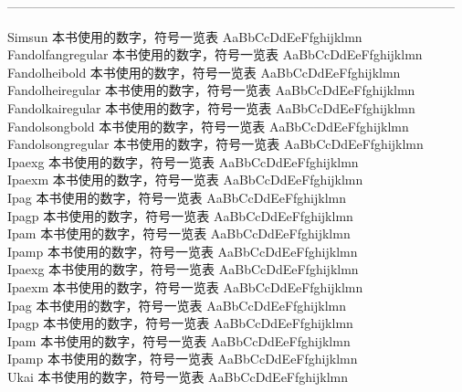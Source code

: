 ———————————————————————————————————

Simsun {\cjk\mktsFontfileSimsun{}本书使用的数字，符号一览表 AaBbCcDdEeFfghijklmn}\\
Fandolfangregular {\cjk\mktsFontfileFandolfangregular{}本书使用的数字，符号一览表 AaBbCcDdEeFfghijklmn}\\
Fandolheibold {\cjk\mktsFontfileFandolheibold{}本书使用的数字，符号一览表 AaBbCcDdEeFfghijklmn}\\
Fandolheiregular {\cjk\mktsFontfileFandolheiregular{}本书使用的数字，符号一览表 AaBbCcDdEeFfghijklmn}\\
Fandolkairegular {\cjk\mktsFontfileFandolkairegular{}本书使用的数字，符号一览表 AaBbCcDdEeFfghijklmn}\\
Fandolsongbold {\cjk\mktsFontfileFandolsongbold{}本书使用的数字，符号一览表 AaBbCcDdEeFfghijklmn}\\
Fandolsongregular {\cjk\mktsFontfileFandolsongregular{}本书使用的数字，符号一览表 AaBbCcDdEeFfghijklmn}\\
Ipaexg {\cjk\mktsFontfileIpaexg{}本书使用的数字，符号一览表 AaBbCcDdEeFfghijklmn}\\
Ipaexm {\cjk\mktsFontfileIpaexm{}本书使用的数字，符号一览表 AaBbCcDdEeFfghijklmn}\\
Ipag {\cjk\mktsFontfileIpag{}本书使用的数字，符号一览表 AaBbCcDdEeFfghijklmn}\\
Ipagp {\cjk\mktsFontfileIpagp{}本书使用的数字，符号一览表 AaBbCcDdEeFfghijklmn}\\
Ipam {\cjk\mktsFontfileIpam{}本书使用的数字，符号一览表 AaBbCcDdEeFfghijklmn}\\
Ipamp {\cjk\mktsFontfileIpamp{}本书使用的数字，符号一览表 AaBbCcDdEeFfghijklmn}\\
Ipaexg {\cjk\mktsFontfileIpaexg{}本书使用的数字，符号一览表 AaBbCcDdEeFfghijklmn}\\
Ipaexm {\cjk\mktsFontfileIpaexm{}本书使用的数字，符号一览表 AaBbCcDdEeFfghijklmn}\\
Ipag {\cjk\mktsFontfileIpag{}本书使用的数字，符号一览表 AaBbCcDdEeFfghijklmn}\\
Ipagp {\cjk\mktsFontfileIpagp{}本书使用的数字，符号一览表 AaBbCcDdEeFfghijklmn}\\
Ipam {\cjk\mktsFontfileIpam{}本书使用的数字，符号一览表 AaBbCcDdEeFfghijklmn}\\
Ipamp {\cjk\mktsFontfileIpamp{}本书使用的数字，符号一览表 AaBbCcDdEeFfghijklmn}\\
Ukai {\cjk\mktsFontfileUkai{}本书使用的数字，符号一览表 AaBbCcDdEeFfghijklmn}\\

